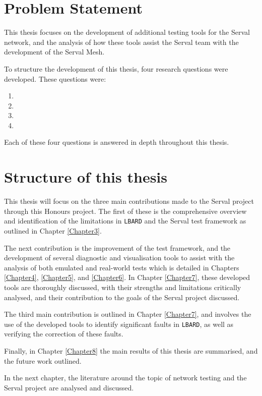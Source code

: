 \section{Problem Statement}
This thesis focuses on the development of additional testing tools for the Serval network, and the analysis of how these tools assist the Serval team with the development of the Serval Mesh.

To structure the development of this thesis, four research questions were developed.
These questions were:
\begin{enumerate}
    \item \firstRQ
    \item \secondRQ
    \item \thirdRQ
    \item \fourthRQ
\end{enumerate}
Each of these four questions is answered in depth throughout this thesis.


\section{Structure of this thesis}
This thesis will focus on the three main contributions made to the Serval project through this Honours project.
The first of these is the comprehensive overview and identification of the limitations in \texttt{LBARD} and the Serval test framework as outlined in Chapter \ref{Chapter3}.

The next contribution is the improvement of the test framework, and the development of several diagnostic and visualisation tools to assist with the analysis of both emulated and real-world tests which is detailed in Chapters \ref{Chapter4}, \ref{Chapter5}, and \ref{Chapter6}. 
In Chapter \ref{Chapter7}, these developed tools are thoroughly discussed, with their strengths and limitations critically analysed, and their contribution to the goals of the Serval project discussed.

The third main contribution is outlined in Chapter \ref{Chapter7}, and involves the use of the developed tools to identify significant faults in \texttt{LBARD}, as well as verifying the correction of these faults.

Finally, in Chapter \ref{Chapter8} the main results of this thesis are summarised, and the future work outlined.

In the next chapter, the literature around the topic of network testing and the Serval project are analysed and discussed.

